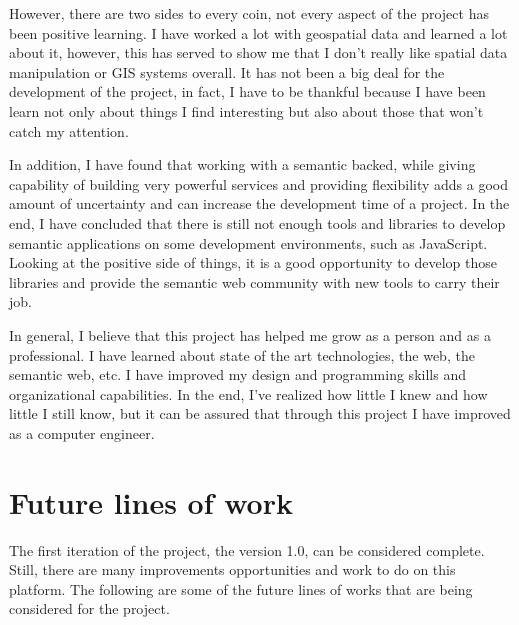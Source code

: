 However, there are two sides to every coin, not every aspect of the project has been positive learning. I have worked a lot with geospatial data and learned a lot about it, however, this has served to show me that I don't really like spatial data manipulation or GIS systems overall. It has not been a big deal for the development of the project, in fact, I have to be thankful because I have been learn not only about things I find interesting but also about those that won't catch my attention.

In addition, I have found that working with a semantic backed, while giving capability of building very powerful services and providing flexibility adds a good amount of uncertainty and can increase the development time of a project. In the end, I have concluded that there is still not enough tools and libraries to develop semantic applications on some development environments, such as JavaScript. Looking at the positive side of things, it is a good opportunity to develop those libraries and provide the semantic web community with new tools to carry their job.

In general, I believe that this project has helped me grow as a person and as a professional. I have learned about state of the art technologies, the web, the semantic web, etc. I have improved my design and programming skills and organizational capabilities. In the end, I've realized how little I knew and how little I still know, but it can be assured that through this project I have improved as a computer engineer.

\section{Future lines of work}

The first iteration of the project, the version 1.0, can be considered complete. Still, there are many improvements opportunities and work to do on this platform. The following are some of the future lines of works that are being considered for the project.

